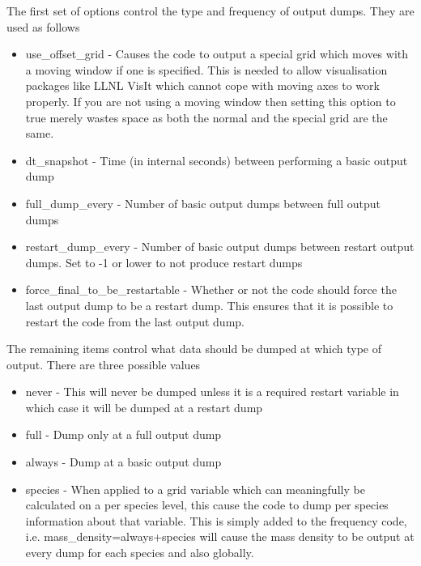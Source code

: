 \documentclass[12pt,a4paper]{article}
\begin{document}
The first set of options control the type and frequency of output dumps. They
are used as follows\\
\begin{itemize}
\item use\_offset\_grid - Causes the code to output a special grid which moves
  with a moving window if one is specified. This is needed to allow
  visualisation packages like LLNL VisIt which cannot cope with moving axes to
  work properly. If you are not using a moving window then setting this option
  to true merely wastes space as both the normal and the special grid are the
  same.
\item dt\_snapshot - Time (in internal seconds) between performing a basic
  output dump
\item full\_dump\_every - Number of basic output dumps between full output
  dumps
\item restart\_dump\_every - Number of basic output dumps between restart
  output dumps. Set to -1 or lower to not produce restart dumps
\item force\_final\_to\_be\_restartable - Whether or not the code should force
  the last output dump to be a restart dump. This ensures that it is possible
  to restart the code from the last output dump.
\end{itemize}

The remaining items control what data should be dumped at which type of
output. There are three possible values\\
\begin{itemize}
\item never - This will never be dumped unless it is a required restart
  variable in which case it will be dumped at a restart dump
\item full - Dump only at a full output dump
\item always - Dump at a basic output dump
\item species - When applied to a grid variable which can meaningfully be
  calculated on a per species level, this cause the code to dump per species
  information about that variable. This is simply added to the frequency code,
  i.e. mass\_density=always+species will cause the mass density to be output
  at every dump for each species and also globally.
\end{itemize}
\end{document}
